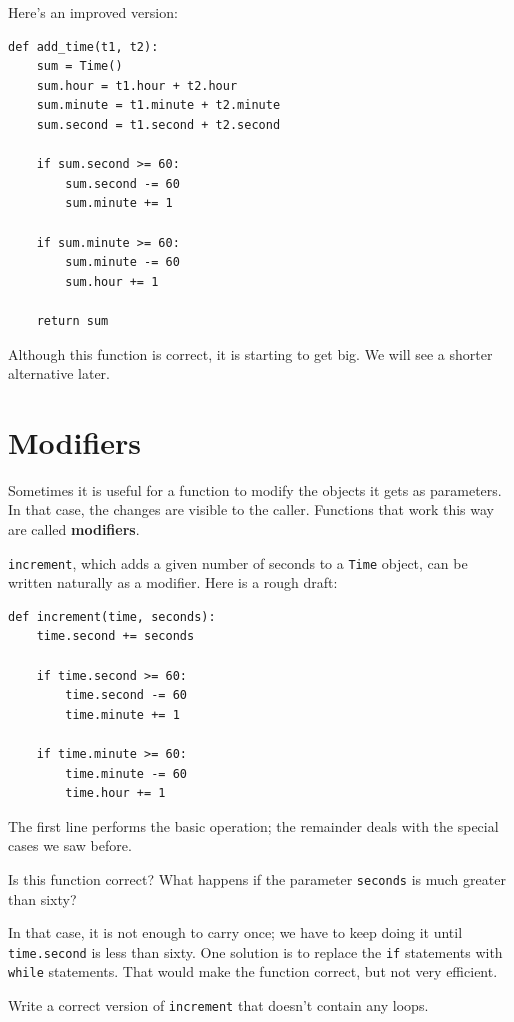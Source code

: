 \documentclass[10pt]{book}
\begin{document}
Here's an improved version:

\begin{verbatim}
def add_time(t1, t2):
    sum = Time()
    sum.hour = t1.hour + t2.hour
    sum.minute = t1.minute + t2.minute
    sum.second = t1.second + t2.second

    if sum.second >= 60:
        sum.second -= 60
        sum.minute += 1

    if sum.minute >= 60:
        sum.minute -= 60
        sum.hour += 1

    return sum
\end{verbatim}
%
Although this function is correct, it is starting to get big.
We will see a shorter alternative later.


\section{Modifiers}
\label{increment}

Sometimes it is useful for a function to modify the objects it gets as
parameters.  In that case, the changes are visible to the caller.
Functions that work this way are called {\bf modifiers}.

{\tt increment}, which adds a given number of seconds to a {\tt Time}
object, can be written naturally as a
modifier.  Here is a rough draft:

\begin{verbatim}
def increment(time, seconds):
    time.second += seconds

    if time.second >= 60:
        time.second -= 60
        time.minute += 1

    if time.minute >= 60:
        time.minute -= 60
        time.hour += 1
\end{verbatim}
%
The first line performs the basic operation; the remainder deals
with the special cases we saw before.

Is this function correct?  What happens if the parameter {\tt seconds}
is much greater than sixty?

In that case, it is not enough to carry
once; we have to keep doing it until {\tt time.second} is less than sixty.
One solution is to replace the {\tt if} statements with {\tt while}
statements.  That would make the function correct, but not
very efficient.

\begin{exercise}

Write a correct version of {\tt increment} that
doesn't contain any loops.

\end{exercise}
\end{document}
